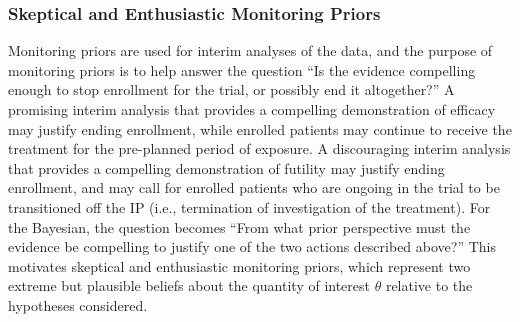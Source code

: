 \documentclass[AMA,STIX1COL,doublespace]{WileyNJD-v2}
\begin{document}
\subsubsection{Skeptical and Enthusiastic Monitoring Priors}\label{sec:MP}
Monitoring priors are used for interim analyses of the data, and the purpose of monitoring priors is to help answer the question ``Is the evidence compelling enough to stop enrollment for the trial, or possibly end it altogether?''
%
A promising interim analysis that provides a compelling demonstration of efficacy may justify ending enrollment, while enrolled patients may continue to receive the treatment for the pre-planned period of exposure. 
%
A discouraging interim analysis that provides a compelling demonstration of futility may justify ending enrollment, and may call for enrolled patients who are ongoing in the trial to be transitioned off the IP (i.e., termination of investigation of the treatment). 
%
For the Bayesian, the question becomes ``From what prior perspective must the evidence be compelling to justify one of the two actions described above?'' 
%
This motivates skeptical and enthusiastic monitoring priors, which represent two extreme but plausible beliefs about the quantity of interest $\theta$ relative to the hypotheses considered.
%
\end{document}
